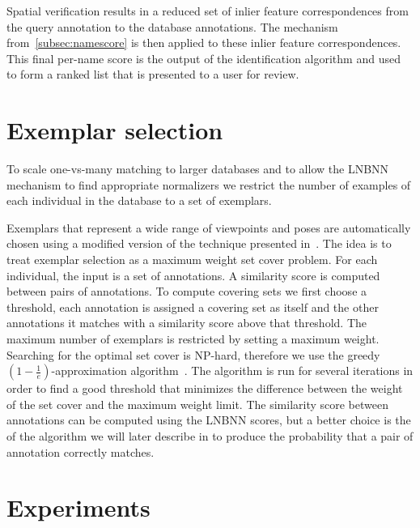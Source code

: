         Spatial verification results in a reduced set of inlier feature correspondences from the query annotation
        to the database annotations. The \namescoring{} mechanism from~\cref{subsec:namescore} is then applied to
        these inlier feature correspondences. This final per-name score is the output of the identification
        algorithm and used to form a ranked list that is presented to a user for review.


\FloatBarrier{}
\section{Exemplar selection}\label{sec:exempselect}
    To scale one-vs-many matching to larger databases and to allow the LNBNN mechanism to find appropriate
    normalizers we restrict the number of examples of each individual in the database to a set of exemplars.

    Exemplars that represent a wide range of viewpoints and poses are automatically chosen using a modified version
    of the technique presented in~\cite{oddone_mobile_2016}. The idea is to treat exemplar selection as a maximum
    weight set cover problem. For each individual, the input is a set of annotations. A similarity score is
    computed between pairs of annotations. To compute covering sets we first choose a threshold, each annotation is
    assigned a covering set as itself and the other annotations it matches with a similarity score above that
    threshold. The maximum number of exemplars is restricted by setting a maximum weight. Searching for the optimal
    set cover is NP-hard, therefore we use the greedy %
    $(1 - \frac{1}{e})$-approximation algorithm~\cite{michael_guide_1979}. The algorithm is run for several
    iterations in order to find a good threshold that minimizes the difference between the weight of the set cover
    and the maximum weight limit. The similarity score between annotations can be computed using the LNBNN scores,
    but a better choice is the of the algorithm we will later describe in  to produce the
    probability that a pair of annotation correctly matches.


\section{Experiments}\label{sec:rankexpt}

